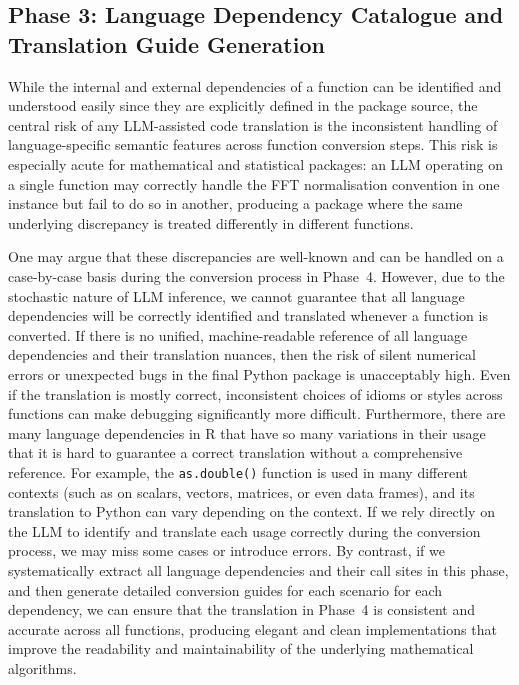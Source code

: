 \documentclass[12pt,a4paper]{article}
\begin{document}
\subsection{Phase 3: Language Dependency Catalogue and Translation Guide Generation}
\label{sec:phase3}

While the internal and external dependencies of a function can be identified and understood easily since they are explicitly defined in the package source, the central risk of any LLM-assisted code translation is the inconsistent handling of language-specific semantic features across function conversion steps. This risk is especially acute for mathematical and statistical packages: an LLM operating on a single function may correctly handle the FFT normalisation convention in one instance but fail to do so in another, producing a package where the same underlying discrepancy is treated differently in different functions.

One may argue that these discrepancies are well-known and can be handled on a case-by-case basis during the conversion process in Phase~4. However, due to the stochastic nature of LLM inference, we cannot guarantee that all language dependencies will be correctly identified and translated whenever a function is converted. If there is no unified, machine-readable reference of all language dependencies and their translation nuances, then the risk of silent numerical errors or unexpected bugs in the final Python package is unacceptably high. Even if the translation is mostly correct, inconsistent choices of idioms or styles across functions can make debugging significantly more difficult. Furthermore, there are many language dependencies in R that have so many variations in their usage that it is hard to guarantee a correct translation without a comprehensive reference. For example, the \texttt{as.double()} function is used in many different contexts (such as on scalars, vectors, matrices, or even data frames), and its translation to Python can vary depending on the context. If we rely directly on the LLM to identify and translate each usage correctly during the conversion process, we may miss some cases or introduce errors. By contrast, if we systematically extract all language dependencies and their call sites in this phase, and then generate detailed conversion guides for each scenario for each dependency, we can ensure that the translation in Phase~4 is consistent and accurate across all functions, producing elegant and clean implementations that improve the readability and maintainability of the underlying mathematical algorithms.
\end{document}
